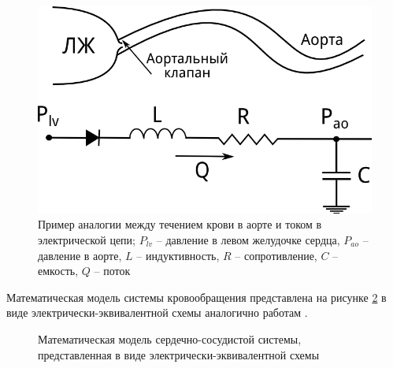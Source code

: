 \begin{figure}[ht] 
  \center
  \includegraphics [scale=1.1] {../images/c2_electric_analogy}
  \caption{Пример аналогии между течением крови в аорте и током в электрической цепи; $P_{lv}$ -- давление в левом желудочке сердца, $P_{ao}$ -- давление в аорте, $L$ -- индуктивность, $R$ -- сопротивление, $C$ -- емкость, $Q$ -- поток}
  \label{img:blood_current_analogy}
\end{figure}

Математическая модель системы кровообращения представлена на рисунке \ref{img:full_cvs} в виде электрически-эквивалентной схемы аналогично работам \cite{Cox_2009, Martina_2013_simulation}. 

\begin{figure}[htb]
	\caption{Математическая модель сердечно-сосудистой системы, представленная в виде электрически-эквивалентной схемы}
	\label{img:full_cvs}
\end{figure}

